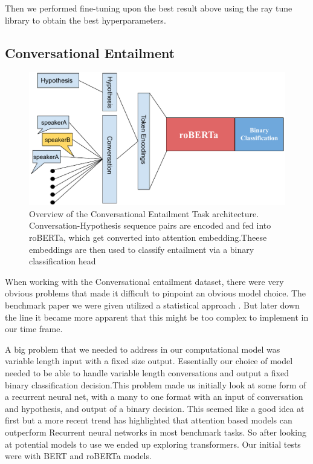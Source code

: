 \documentclass[11pt,a4paper]{article}
\begin{document}
Then we performed fine-tuning upon the best result above using the ray tune library \citep{liaw2018tune} to obtain the best hyperparameters.



\subsection{Conversational Entailment}

\begin{figure}[t]
    \centering
    \includegraphics[width=\linewidth]{assets/ce_diagram.pdf}
    \caption{Overview of the Conversational Entailment Task architecture. Conversation-Hypothesis sequence pairs are encoded and fed into roBERTa, which get converted into attention embedding.Theese embeddings are then used to classify entailment via a binary classification head}
\end{figure}

When working with the Conversational entailment dataset, there were very obvious problems that made it difficult to pinpoint an obvious model choice. The benchmark paper we were given utilized a statistical approach \citep{zhang-chai-2009-know}. But later down the line it became more apparent that this might be too complex to implement in our time frame. 

A big problem that we needed to address in our computational model was variable length input with a fixed size output. Essentially our choice of model needed to be able to handle variable length conversations and output a fixed binary classification decision.This problem made us initially look at some form of a recurrent neural net, with a many to one format with an input of conversation and hypothesis, and output  of a binary decision. This seemed like a good idea at first but a more recent trend has highlighted that attention based models \citep{vaswani2017attention} can outperform Recurrent neural networks in most benchmark tasks. So after looking at potential models to use we ended up exploring transformers. Our initial tests were with BERT and roBERTa \citep{liu2019roberta} models. 
    
\end{document}
